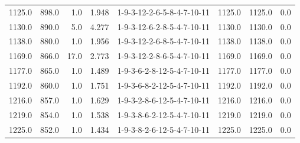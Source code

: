 \begin{tabular}{rrrrlrrr}
 1125.0 &   898.0 &            1.0 &              1.948 &  1-9-3-12-2-6-5-8-4-7-10-11 &        1125.0 &          1125.0 &       0.0 \\
 1130.0 &   890.0 &            5.0 &              4.277 &  1-9-3-12-6-2-8-5-4-7-10-11 &        1130.0 &          1130.0 &       0.0 \\
 1138.0 &   880.0 &            1.0 &              1.956 &  1-9-3-12-2-6-8-5-4-7-10-11 &        1138.0 &          1138.0 &       0.0 \\
 1169.0 &   866.0 &           17.0 &              2.773 &  1-9-3-12-2-8-6-5-4-7-10-11 &        1169.0 &          1169.0 &       0.0 \\
 1177.0 &   865.0 &            1.0 &              1.489 &  1-9-3-6-2-8-12-5-4-7-10-11 &        1177.0 &          1177.0 &       0.0 \\
 1192.0 &   860.0 &            1.0 &              1.751 &  1-9-3-6-8-2-12-5-4-7-10-11 &        1192.0 &          1192.0 &       0.0 \\
 1216.0 &   857.0 &            1.0 &              1.629 &  1-9-3-2-8-6-12-5-4-7-10-11 &        1216.0 &          1216.0 &       0.0 \\
 1219.0 &   854.0 &            1.0 &              1.538 &  1-9-3-8-6-2-12-5-4-7-10-11 &        1219.0 &          1219.0 &       0.0 \\
 1225.0 &   852.0 &            1.0 &              1.434 &  1-9-3-8-2-6-12-5-4-7-10-11 &        1225.0 &          1225.0 &       0.0 \\
\bottomrule
\end{tabular}
